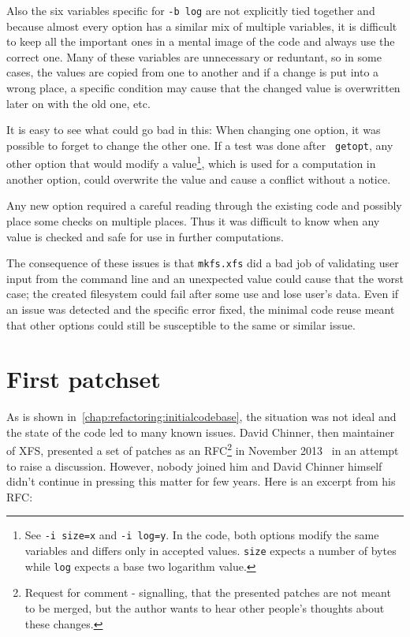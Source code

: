 Also the six variables specific for {\tt -b log} are not explicitly tied
together and because almost every option has a similar mix of multiple
variables, it is difficult to keep all the important ones in a mental image
of the code and always use the correct one. Many of these variables are
unnecessary or reduntant, so in some cases, the values are copied from one
to another and if a change is put into a wrong place, a specific condition
may cause that the changed value is overwritten later on with the old one,
etc.

It is easy to see what could go bad in this: When changing one option, it was
possible to forget to change the other one. If a test was done after {\tt
getopt}, any other option that would modify a value\footnote{See {\tt -i
size=x} and {\tt -i log=y}. In the code, both options modify the same variables
and differs only in accepted values. {\tt size} expects a number of bytes while
{\tt log} expects a base two logarithm value.}, which is used for a computation
in another option, could overwrite the value and cause a conflict without a
notice.

Any new option required a careful reading through the existing code and
possibly place some checks on multiple places. Thus it was difficult to know
when any value is checked and safe for use in further computations.


The consequence of these issues is that {\tt mkfs.xfs} did a bad job of
validating user input from the command line and an unexpected value could
cause that the worst case; the created filesystem could fail after some use
and lose user's data. Even if an issue was detected and the specific
error fixed, the minimal code reuse meant that other options could still be
susceptible to the same or similar issue.

\section{First patchset}\label{chap:refactoring:first}

As is shown in~\ref{chap:refactoring:initialcodebase}, the situation was not ideal and the
state of the code led to many known issues. David Chinner, then maintainer
of XFS, presented a set of patches as an RFC\footnote{Request for comment -
	signalling, that the presented patches are not meant to be merged,
but the author wants to hear other people's thoughts about these changes.}
in November 2013~\cite{davidsPatches} in an attempt to raise a discussion.
However, nobody joined him and David Chinner himself didn't continue in
pressing this matter for few years. Here is an excerpt from his RFC:


